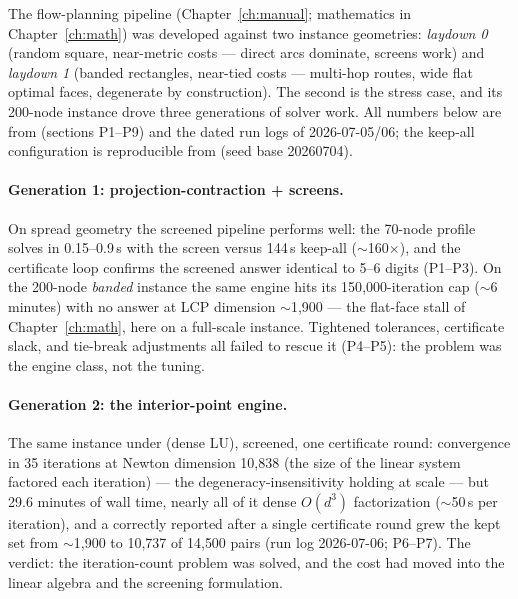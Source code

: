 The flow-planning pipeline (Chapter~\ref{ch:manual}; mathematics in
Chapter~\ref{ch:math}) was developed against two instance geometries:
\emph{laydown 0} (random square, near-metric costs --- direct arcs
dominate, screens work) and \emph{laydown 1} (banded rectangles,
near-tied costs --- multi-hop routes, wide flat optimal faces, degenerate
by construction). The second is the stress case, and its 200-node instance
drove three generations of solver work. All numbers below are from
 (sections P1--P9) and the dated run
logs of 2026-07-05/06; the keep-all configuration is reproducible from
 (seed base 20260704).

\paragraph{Generation 1: projection-contraction + screens.} On spread
geometry the screened pipeline performs well: the 70-node profile solves in
0.15--0.9\,s with the screen versus 144\,s keep-all ($\sim$160$\times$),
and the certificate loop confirms the screened answer identical to 5--6
digits (P1--P3). On the 200-node \emph{banded} instance the same engine
hits its 150{,}000-iteration cap ($\sim$6 minutes) with no answer at LCP
dimension $\sim$1{,}900 --- the flat-face stall of Chapter~\ref{ch:math},
here on a full-scale instance. Tightened tolerances, certificate slack,
and tie-break adjustments all failed to rescue it (P4--P5): the problem
was the engine class, not the tuning.

\paragraph{Generation 2: the interior-point engine.} The same instance
under  (dense LU), screened, one certificate round:
convergence in 35 iterations at Newton dimension 10{,}838 (the size of the
linear system factored each iteration) --- the degeneracy-insensitivity
holding at scale --- but 29.6 minutes of wall time, nearly all of it dense
$O(d^3)$ factorization ($\sim$50\,s per iteration), and a correctly
reported  after a single certificate round grew
the kept set from $\sim$1{,}900 to 10{,}737 of 14{,}500 pairs (run log
2026-07-06; P6--P7). The verdict: the iteration-count problem was solved,
and the cost had moved into the linear algebra and the screening
formulation.

